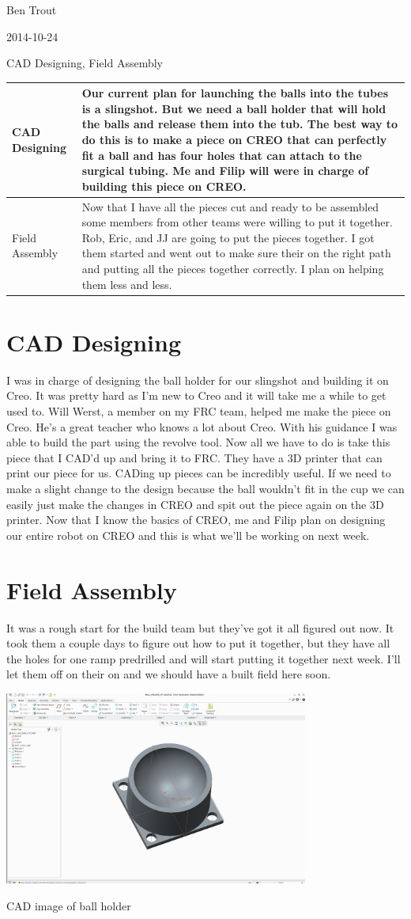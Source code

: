 Ben Trout

2014-10-24

CAD Designing, Field Assembly

\begin{tabular}{|p{5cm}|p{5cm}|}
\hline
CAD Designing&
Our current plan for launching the balls into the tubes is a slingshot. But we need a ball holder that will hold the balls and release them into the tub. The best way to do this is to make a piece on CREO that can perfectly fit a ball and has four holes that can attach to the surgical tubing. Me and Filip will were in charge of building this piece on CREO.
\\
\hline
Field Assembly&
Now that I have all the pieces cut and ready to be assembled some members from other teams were willing to put it together. Rob, Eric, and JJ are going to put the pieces together. I got them started and went out to make sure their on the right path and putting all the pieces together correctly. I plan on helping them less and less.
\\
\hline
\end{tabular}

\section*{CAD Designing}
I was in charge of designing the ball holder for our slingshot and building it on Creo. It was pretty hard as I'm new to Creo and it will take me a while to get used to. Will Werst, a member on my FRC team, helped me make the piece on Creo. He's a great teacher who knows a lot about Creo. With his guidance I was able to build the part using the revolve tool. Now all we have to do is take this piece that I CAD'd up and bring it to FRC. They have a 3D printer that can print our piece for us. CADing up pieces can be incredibly useful. If we need to make a slight change to the design because the ball wouldn't fit in the cup we can easily just make the changes in CREO and spit out the piece again on the 3D printer. Now that I know the basics of CREO, me and Filip plan on designing our entire robot on CREO and this is what we'll be working on next week.

\section*{Field Assembly}
It was a rough start for the build team but they’ve got it all figured out now. It took them a couple days to figure out how to put it together, but they have all the holes for one ramp predrilled and will start putting it together next week. I’ll let them off on their on and we should have a built field here soon. 

\begin{center}
\includegraphics[width=10cm]{./Entries/Images/BallHolder.PNG}
\end{center}

CAD image of ball holder
